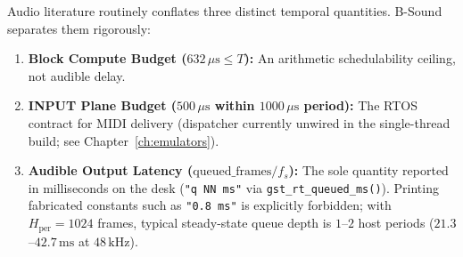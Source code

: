 Audio literature routinely conflates three distinct temporal quantities. B-Sound separates them rigorously:
\begin{enumerate}[leftmargin=1.5em]
  \item \textbf{Block Compute Budget ($632\,\mu\text{s} \le T$):} An arithmetic schedulability ceiling, not audible delay.
  \item \textbf{INPUT Plane Budget ($500\,\mu\text{s}$ within $1000\,\mu\text{s}$ period):} The RTOS contract for MIDI delivery (dispatcher currently unwired in the single-thread build; see Chapter~\ref{ch:emulators}).
  \item \textbf{Audible Output Latency ($\mathrm{queued\_frames} / f_s$):} The sole quantity reported in milliseconds on the desk (\texttt{"q NN ms"} via \texttt{gst\_rt\_queued\_ms()}). Printing fabricated constants such as \texttt{"0.8 ms"} is explicitly forbidden; with $H_{\text{per}} = 1024$ frames, typical steady-state queue depth is $1$--$2$ host periods ($21.3$--$42.7\,\text{ms}$ at $48\,\text{kHz}$).
\end{enumerate}
